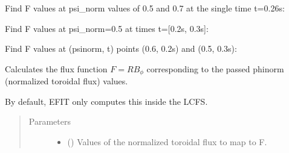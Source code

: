\documentclass[letterpaper,10pt,english]{sphinxmanual}
\begin{document}
\begin{fulllineitems}
\begin{fulllineitems}
Find F values at psi\_norm values of 0.5 and 0.7 at the single time
t=0.26s:

\begin{sphinxVerbatim}[commandchars=\\\{\}]
  \PYG{p}{[} \PYG{p}{]} 
\end{sphinxVerbatim}

Find F values at psi\_norm=0.5 at times t={[}0.2s, 0.3s{]}:

\begin{sphinxVerbatim}[commandchars=\\\{\}]
   \PYG{p}{[} \PYG{p}{]}
\end{sphinxVerbatim}

Find F values at (psinorm, t) points (0.6, 0.2s) and (0.5, 0.3s):

\begin{sphinxVerbatim}[commandchars=\\\{\}]
  \PYG{p}{[} \PYG{p}{]} \PYG{p}{[} \PYG{p}{]} 
\end{sphinxVerbatim}

\end{fulllineitems}


\begin{fulllineitems}
\label{\detokenize{eqtools:eqtools.core.Equilibrium.phinorm2F}}
Calculates the flux function \(F=RB_{\phi}\) corresponding to the passed phinorm (normalized toroidal flux) values.

By default, EFIT only computes this inside the LCFS.
\begin{quote}\begin{description}
\item[{Parameters}] \leavevmode\begin{itemize}
\item {} 
 () \textendash{} Values of the normalized
toroidal flux to map to F.


\end{itemize}
\end{description}
\end{quote}
\end{fulllineitems}
\end{fulllineitems}
\end{document}
